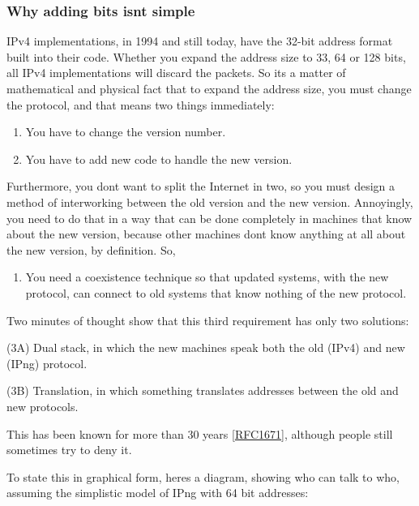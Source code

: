 \documentclass[
]{article}
\providecommand{\tightlist}{%
  \setlength{\itemsep}{0pt}\setlength{\parskip}{0pt}}
\begin{document}
\subsubsection{Why adding bits isn\textquotesingle t
simple}\label{why-adding-bits-isnt-simple}

IPv4 implementations, in 1994 and still today, have the 32-bit address
format built into their code. Whether you expand the address size to 33,
64 or 128 bits, all IPv4 implementations will discard the packets. So
it\textquotesingle s a matter of mathematical and physical fact that to
expand the address size, you must change the protocol, and that means
two things immediately:

\begin{enumerate}
\def\labelenumi{\arabic{enumi}.}
\item
  You have to change the version number.
\item
  You have to add new code to handle the new version.
\end{enumerate}

Furthermore, you don\textquotesingle t want to split the Internet in
two, so you must design a method of interworking between the old version
and the new version. Annoyingly, you need to do that in a way that can
be done completely in machines that know about the new version, because
other machines don\textquotesingle t know anything at all about the new
version, by definition. So,

\begin{enumerate}
\def\labelenumi{\arabic{enumi}.}
\setcounter{enumi}{2}
\tightlist
\item
  You need a coexistence technique so that updated systems, with the new
  protocol, can connect to old systems that know nothing of the new
  protocol.
\end{enumerate}

Two minutes of thought show that this third requirement has only two
solutions:

(3A) Dual stack, in which the new machines speak both the old (IPv4) and
new (IPng) protocol.

(3B) Translation, in which something translates addresses between the
old and new protocols.

This has been known for more than 30 years
{[}\href{https://www.rfc-editor.org/info/rfc1671}{RFC1671}{]}, although
people still sometimes try to deny it.

To state this in graphical form, here\textquotesingle s a diagram,
showing who can talk to who, assuming the simplistic model of IPng with
64 bit addresses:
\end{document}

